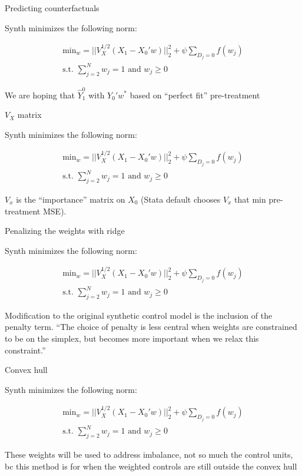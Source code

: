 \documentclass{beamer}
\begin{document}
\begin{frame}{Predicting counterfactuals}

Synth minimizes the following norm:

\begin{eqnarray*}
\textrm{min}_w = || V_X^{1/2} (X_1 - X_0'w) ||_2^2 + \psi \sum_{D_j=0}f(w_j)\\
\textrm{s.t. }\sum_{j=2}^N w_{j} =1 \textrm{ and } w_j \geq 0
\end{eqnarray*}

We are hoping that $\widehat{Y}_1^0$ with $Y_0' {w}^{*}$ based on ``perfect fit'' pre-treatment

\end{frame}




\begin{frame}{$V_X$ matrix}

Synth minimizes the following norm:

\begin{eqnarray*}
\textrm{min}_w = || V_X^{1/2} (X_1 - X_0'w) ||_2^2 + \psi \sum_{D_j=0}f(w_j)\\
\textrm{s.t. }\sum_{j=2}^N w_{j} =1 \textrm{ and } w_j \geq 0
\end{eqnarray*}

$V_x$ is the ``importance'' matrix on $X_0$ (Stata default chooses $V_x$ that min pre-treatment MSE).
\end{frame}

\begin{frame}{Penalizing the weights with ridge}

Synth minimizes the following norm:

\begin{eqnarray*}
\textrm{min}_w = || V_X^{1/2} (X_1 - X_0'w) ||_2^2 + \psi \sum_{D_j=0}f(w_j)\\
\textrm{s.t. }\sum_{j=2}^N w_{j} =1 \textrm{ and } w_j \geq 0
\end{eqnarray*}

Modification to the original synthetic control model is the inclusion of the penalty term. ``The choice of penalty is less central when weights are constrained to be on the simplex, but becomes more important when we relax this constraint.''

\end{frame}

\begin{frame}{Convex hull}

Synth minimizes the following norm:

\begin{eqnarray*}
\textrm{min}_w = || V_X^{1/2} (X_1 - X_0'w) ||_2^2 + \psi \sum_{D_j=0}f(w_j)\\
\textrm{s.t. }\sum_{j=2}^N w_{j} =1 \textrm{ and } w_j \geq 0
\end{eqnarray*}

These weights will be used to address imbalance, not so much the control units, bc this method is for when the weighted controls are still outside the convex hull

\end{frame}
\end{document}
